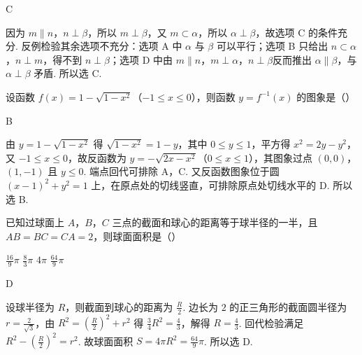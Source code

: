 \documentclass[UTF8,a4paper,oneside,11pt]{ctexbook}
\begin{document}
\begin{answer}
C
\end{answer}

\begin{solution}
因为 \(m\parallel n\)，\(n\perp\beta\)，所以 \(m\perp\beta\)，又 \(m\subset\alpha\)，所以 \(\alpha\perp\beta\)，故选项 C 的条件充分. 反例检验其余选项不充分：选项 A 中 \(\alpha\) 与 \(\beta\) 可以平行；选项 B 只给出 \(n\subset\alpha\)，\(n\perp m\)，得不到 \(n\perp\beta\)；选项 D 中由 \(m\parallel n\)，\(m\perp\alpha\)，\(n\perp\beta\)反而推出 \(\alpha\parallel\beta\)，与 \(\alpha\perp\beta\) 矛盾. 所以选 C.
\end{solution}

\begin{problem}
设函数 \(f(x)=1-\sqrt{1-x^{2}}\)（\(-1\leqslant x\leqslant 0\)），则函数 \(y=f^{-1}(x)\) 的图象是（\quad）

\choices
{}
{}
{}
{}
\end{problem}

\begin{answer}
B
\end{answer}

\begin{solution}
由 \(y=1-\sqrt{1-x^{2}}\) 得 \(\sqrt{1-x^{2}}=1-y\)，其中 \(0\leqslant y\leqslant 1\)，平方得 \(x^{2}=2y-y^{2}\)，又 \(-1\leqslant x\leqslant 0\)，故反函数为 \(y=-\sqrt{2x-x^{2}}\)（\(0\leqslant x\leqslant 1\)），其图象过点 \((0,0)\)，\((1,-1)\) 且 \(y\leqslant 0\). 端点回代可排除 A，C. 又反函数图象位于圆 \((x-1)^2+y^2=1\) 上，在原点处的切线竖直，可排除原点处切线水平的 D. 所以选 B.
\end{solution}

\begin{problem}
已知过球面上 \(A\)，\(B\)，\(C\) 三点的截面和球心的距离等于球半径的一半，且 \(AB=BC=CA=2\)，则球面面积是（\quad）

\choices
    {\(\frac{16}{9}\pi\)}
    {\(\frac{8}{3}\pi\)}
    {\(4\pi\)}
    {\(\frac{64}{9}\pi\)}
\end{problem}

\begin{answer}
D
\end{answer}

\begin{solution}
设球半径为 \(R\)，则截面到球心的距离为 \(\frac{R}{2}\). 边长为 \(2\) 的正三角形的截面圆半径为 \(r=\frac{2}{\sqrt{3}}\)，由 \(R^{2}=\left( \frac{R}{2} \right)^{2}+r^{2}\) 得 \(\frac{3}{4}R^{2}=\frac{4}{3}\)，解得 \(R=\frac{4}{3}\). 回代检验满足 \(R^{2}-\left( \frac{R}{2} \right)^{2}=r^{2}\). 故球面面积 \(S=4\pi R^{2}=\frac{64}{9}\pi\). 所以选 D.
\end{solution}
\end{document}
